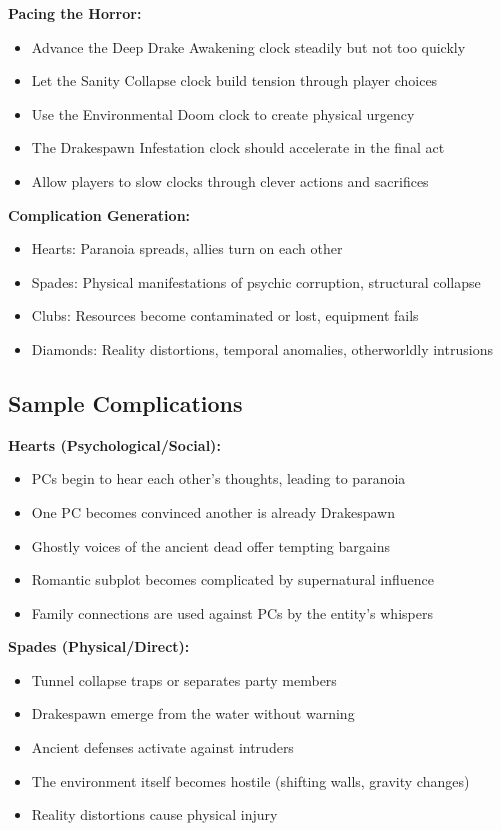 \documentclass[11pt]{article}
\begin{document}
\textbf{Pacing the Horror:}
\begin{itemize}
\item Advance the Deep Drake Awakening clock steadily but not too quickly
\item Let the Sanity Collapse clock build tension through player choices
\item Use the Environmental Doom clock to create physical urgency
\item The Drakespawn Infestation clock should accelerate in the final act
\item Allow players to slow clocks through clever actions and sacrifices
\end{itemize}

\textbf{Complication Generation:}
\begin{itemize}
\item Hearts: Paranoia spreads, allies turn on each other
\item Spades: Physical manifestations of psychic corruption, structural collapse
\item Clubs: Resources become contaminated or lost, equipment fails
\item Diamonds: Reality distortions, temporal anomalies, otherworldly intrusions
\end{itemize}

\subsection{Sample Complications}

\textbf{Hearts (Psychological/Social):}
\begin{itemize}
\item PCs begin to hear each other's thoughts, leading to paranoia
\item One PC becomes convinced another is already Drakespawn
\item Ghostly voices of the ancient dead offer tempting bargains
\item Romantic subplot becomes complicated by supernatural influence
\item Family connections are used against PCs by the entity's whispers
\end{itemize}

\textbf{Spades (Physical/Direct):}
\begin{itemize}
\item Tunnel collapse traps or separates party members
\item Drakespawn emerge from the water without warning
\item Ancient defenses activate against intruders
\item The environment itself becomes hostile (shifting walls, gravity changes)
\item Reality distortions cause physical injury
\end{itemize}
\end{document}
